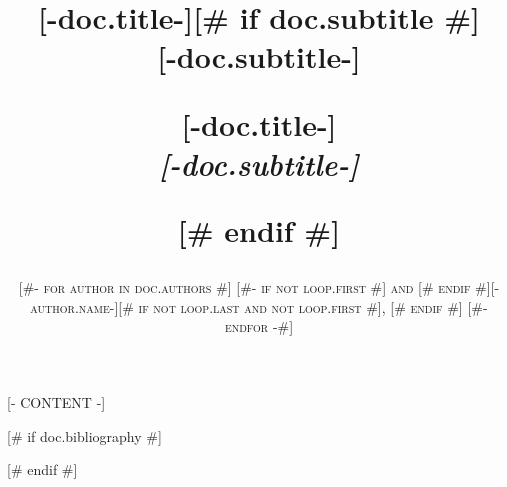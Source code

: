 \documentclass[a4paper,12pt,twoside]{book} %
\title{%
 \Huge \textbf{[-doc.title-]} \\  %
 [# if doc.subtitle #] 
   \vspace{0.5em}
   \huge \textit{[-doc.subtitle-]}\title{\Huge \textbf{[-doc.title-]}[# if doc.subtitle #] \\ \huge [-doc.subtitle-]} %
 [# endif #]
}
\author{\textsc{
[#- for author in doc.authors #]
  [#- if not loop.first #] and [# endif #][-author.name-][# if not loop.last and not loop.first #], [# endif #]
[#- endfor -#]
}}
\begin{document}
\sloppy  %

\frontmatter
\maketitle
\tableofcontents

\mainmatter  %


[- CONTENT -]


[# if doc.bibliography #]

[# endif #]
\end{document}
